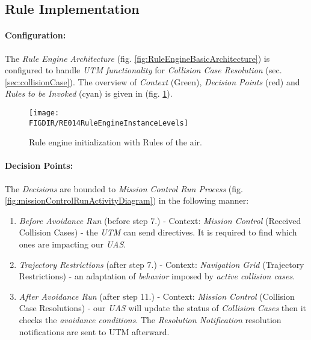 \subsection{Rule Implementation}\label{sec:ruleImplementation}

\paragraph{Configuration:} The \emph{Rule Engine Architecture} (fig. \ref{fig:RuleEngineBasicArchitecture}) is configured to handle \emph{UTM functionality} for \emph{Collision Case Resolution} (sec. \ref{sec:collisionCase}).  The overview of \emph{Context} (Green), \emph{Decision Points} (red) and \emph{Rules to be Invoked} (cyan) is given in (fig. \ref{fig:RuleEngineInstanceLevels}). 

\begin{figure}[H]
    \centering
    \texttt{[image: \\FIGDIR/RE014RuleEngineInstanceLevels]} 
    \caption{Rule engine initialization with Rules of the air.}
    \label{fig:RuleEngineInstanceLevels}
\end{figure}

\paragraph{Decision Points:} The \emph{Decisions} are bounded to \emph{Mission Control Run Process} (fig. \ref{fig:missionControlRunActivityDiagram}) in the following manner:
\begin{enumerate}
    \item \emph{Before Avoidance Run} (before step 7.) - Context: \emph{Mission Control} (Received Collision Cases) - the \emph{UTM} can send  directives. It is required to find which ones are impacting our \emph{UAS}.
    
    \item \emph{Trajectory Restrictions} (after step 7.) - Context: \emph{Navigation Grid} (Trajectory Restrictions) - an adaptation of \emph{behavior} imposed by \emph{active collision cases}.
    
    \item \emph{After Avoidance Run} (after step 11.) - Context: \emph{Mission Control} (Collision Case Resolutions) - our \emph{UAS} will update the status of \emph{Collision Cases} then it checks the \emph{avoidance conditions}. The \emph{Resolution Notification} resolution notifications are sent to UTM afterward.
    
\end{enumerate}

